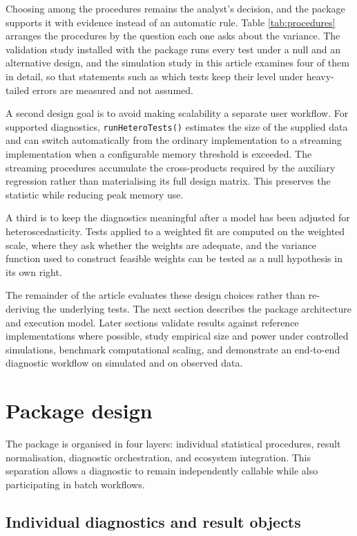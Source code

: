 Choosing among the procedures remains the analyst's decision, and the package
supports it with evidence instead of an automatic rule. Table
\ref{tab:procedures} arranges the procedures by the question each one asks
about the variance. The validation study installed with the package runs every
test under a null and an alternative design, and the simulation study in this
article examines four of them in detail, so that statements such as which
tests keep their level under heavy-tailed errors are measured and not assumed.

A second design goal is to avoid making scalability a separate user workflow.
For supported diagnostics, \texttt{runHeteroTests()} estimates the size of the supplied
data and can switch automatically from the ordinary implementation to a
streaming implementation when a configurable memory threshold is exceeded.
The streaming procedures accumulate the cross-products required by the
auxiliary regression rather than materialising its full design matrix. This
preserves the statistic while reducing peak memory use.

A third is to keep the diagnostics meaningful after a model has been adjusted
for heteroscedasticity. Tests applied to a weighted fit are computed on the
weighted scale, where they ask whether the weights are adequate, and the
variance function used to construct feasible weights can be tested as a null
hypothesis in its own right.

The remainder of the article evaluates these design choices rather than
re-deriving the underlying tests. The next section describes the package
architecture and execution model. Later sections validate results against
reference implementations where possible, study empirical size and power under
controlled simulations, benchmark computational scaling, and demonstrate an
end-to-end diagnostic workflow on simulated and on observed data.

\section{Package design}\label{package-design}

The package is organised in four layers: individual statistical procedures,
result normalisation, diagnostic orchestration, and ecosystem integration. This
separation allows a diagnostic to remain independently callable while also
participating in batch workflows.

\subsection{Individual diagnostics and result objects}\label{individual-diagnostics-and-result-objects}

